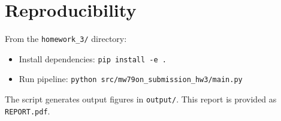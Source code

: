 \documentclass[11pt,a4paper]{article}
\begin{document}
\section*{Reproducibility}
From the \texttt{homework\_3/} directory:
\begin{itemize}[leftmargin=*]
    \item Install dependencies: \texttt{pip install -e .}
    \item Run pipeline: \texttt{python src/mw79on\_submission\_hw3/main.py}
\end{itemize}
The script generates output figures in \texttt{output/}.
This report is provided as \texttt{REPORT.pdf}.
\end{document}
